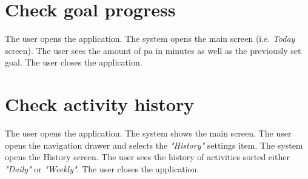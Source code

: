 \section*{Check goal progress}
    The user opens the application. The system opens the main screen (i.e. \textit{Today} screen). The user sees the amount of \gls{pa} in minutes as well as the previously set goal. The user closes the application.
    
\section*{Check activity history}
    The user opens the application. The system shows the main screen. The user opens the navigation drawer and selects the \textit{"History"} settings item. The system opens the History screen. The user sees the history of activities sorted either \textit{"Daily"} or \textit{"Weekly"}. The user closes the application. 